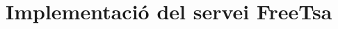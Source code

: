 \chapter{Implementació del servei FreeTsa}
\begin{comment}
\label{appendix:tsa}
\begin{listing}[h]
\inputminted[
    firstline=9, 
    lastline=31,
    fontsize=\footnotesize]{php}{resources/src/TimeStampAuthorityService.php}
\caption{}
\label{code:tsa1}
\end{listing}

\begin{listing}[h]
\inputminted[
    firstline=32, 
    lastline=50,
    fontsize=\footnotesize]{php}{resources/src/TimeStampAuthorityService.php}
\caption{}
\label{code:tsa2}
\end{listing}

\begin{listing}[h]
\inputminted[
    firstline=51,
    lastline=63,
    fontsize=\footnotesize]{php}{resources/src/TimeStampAuthorityService.php}
\caption{}
\label{code:tsa3}
\end{listing}

\begin{listing}[h]
\inputminted[
    firstline=64,
    lastline=94,
    fontsize=\footnotesize]{php}{resources/src/TimeStampAuthorityService.php}
\caption{}
\label{code:tsa3}
\end{listing}

\begin{listing}[h]
\inputminted[
    firstline=95,
    lastline=116,
    fontsize=\footnotesize]{php}{resources/src/TimeStampAuthorityService.php}
\caption{}
\label{code:tsa3}
\end{listing}
\end{comment}

\inputminted[fontsize=\footnotesize]{php}{resources/src/TimeStampAuthorityService.php}